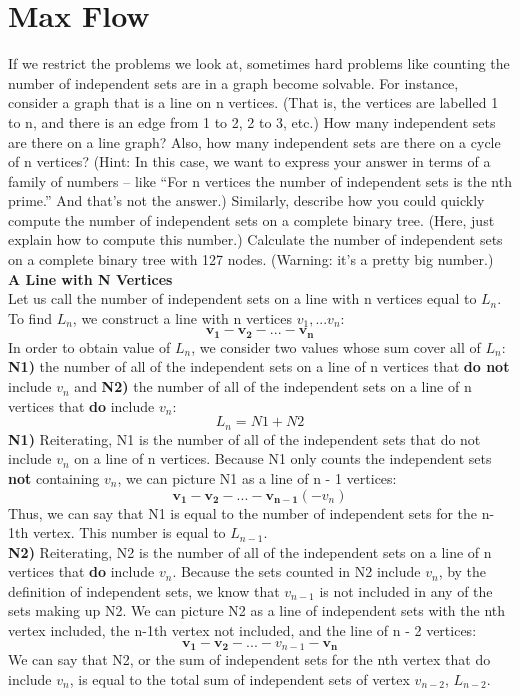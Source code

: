 \documentclass[11pt, solution, letterpaper]{format}
\begin{document}
\clearpage
\section{Max Flow}
If we restrict the problems we look at, sometimes hard problems like counting the number of independent sets
are in a graph become solvable. For instance, consider a graph that is a line on n vertices. (That is, the vertices
are labelled 1 to n, and there is an edge from 1 to 2, 2 to 3, etc.) How many independent sets are there on a
line graph? Also, how many independent sets are there on a cycle of n vertices? (Hint: In this case, we want
to express your answer in terms of a family of numbers – like “For n vertices the number of independent sets
is the nth prime.” And that’s not the answer.)
Similarly, describe how you could quickly compute the number of independent sets on a complete binary tree.
(Here, just explain how to compute this number.) Calculate the number of independent sets on a complete
binary tree with 127 nodes. (Warning: it’s a pretty big number.)\\

\textbf{A Line with N Vertices}\\
Let us call the number of independent sets on a line with n vertices equal to $L_n$. To find $L_n$, we construct a line with n vertices {$v_1, ... v_n$}: $$\pmb{v_1-v_2-  ...  -v_n}$$
In order to obtain value of $L_n$, we consider two values whose sum cover all of $L_n$: \textbf{N1)} the number of all of the independent sets on a line of n vertices that \textbf{do not} include $v_n$ and \textbf{N2)} the number of all of the independent sets on a line of n vertices that \textbf{do} include $v_n$: $$L_n = N1 + N2$$
\textbf{N1)} Reiterating, N1 is the number of all of the independent sets that do not include $v_n$ on a line of n vertices. Because N1 only counts the independent sets \textbf{not} containing $v_n$, we can picture N1 as a line of n - 1 vertices:
$$\pmb{v_1-v_2-  ...  -v_{n-1}}(-v_n)$$
Thus, we can say that N1 is equal to the number of independent sets for the n-1th vertex. This number is equal to $L_{n-1}$. \\

\textbf{N2)} Reiterating, N2 is the number of all of the independent sets on a line of n vertices that \textbf{do} include $v_n$. Because the sets counted in N2 include $v_n$, by the definition of independent sets, we know that $v_{n-1}$ is not included in any of the sets making up N2. We can picture N2 as a line of independent sets with the nth vertex included, the n-1th vertex not included, and the line of n - 2 vertices:
$$\pmb{v_1-v_2-  ... }-v_{n-1}-\pmb{v_n}$$
We can say that N2, or the sum of independent sets for the nth vertex that do include $v_n$, is equal to the total sum of independent sets of vertex $v_{n-2}$, $L_{n-2}$. \\
\end{document}
